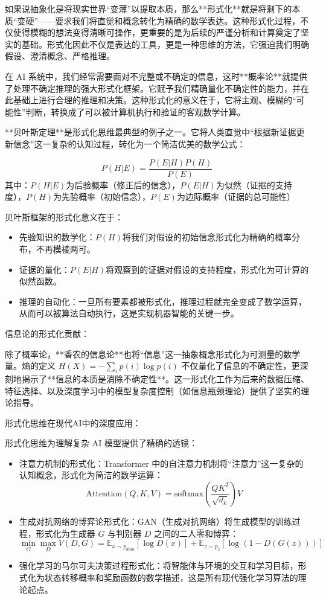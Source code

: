 如果说抽象化是将现实世界“变薄”以提取本质，那么**形式化**就是将剩下的本质“变硬”——要求我们将直觉和概念转化为精确的数学表达。这种形式化过程，不仅使得模糊的想法变得清晰可操作，更重要的是为后续的严谨分析和计算奠定了坚实的基础。形式化因此不仅是表达的工具，更是一种思维的方法，它强迫我们明确假设、澄清概念、严格推理。

在 AI 系统中，我们经常需要面对不完整或不确定的信息，这时**概率论**就提供了处理不确定推理的强大形式化框架。它赋予我们精确量化不确定性的能力，并在此基础上进行合理的推理和决策。这种形式化的意义在于，它将主观、模糊的“可能性”判断，转换成了可以被计算机执行和验证的客观数学计算。

**贝叶斯定理**是形式化思维最典型的例子之一。它将人类直觉中“根据新证据更新信念”这一复杂的认知过程，转化为一个简洁优美的数学公式：

\begin{tcolorbox}[colback=green!5!white,colframe=green!75!black,title=核心定理：贝叶斯定理]
$$P(H|E) = \frac{P(E|H)P(H)}{P(E)}$$
其中：$P(H|E)$为后验概率（修正后的信念），$P(E|H)$为似然（证据的支持度），$P(H)$为先验概率（初始信念），$P(E)$为边际概率（证据的总可能性）
\end{tcolorbox}

贝叶斯框架的形式化意义在于：

\begin{itemize}
\item 先验知识的数学化：$P(H)$将我们对假设的初始信念形式化为精确的概率分布，不再模棱两可。
\item 证据的量化：$P(E|H)$将观察到的证据对假设的支持程度，形式化为可计算的似然函数。
\item 推理的自动化：一旦所有要素都被形式化，推理过程就完全变成了数学运算，从而可以被算法自动执行，这是实现机器智能的关键一步。
\end{itemize}

信息论的形式化贡献：

除了概率论，**香农的信息论**也将“信息”这一抽象概念形式化为可测量的数学量。熵的定义 $H(X) = -\sum_{i} p(i) \log p(i)$ 不仅量化了信息的不确定性，更深刻地揭示了**信息的本质是消除不确定性**。这一形式化工作为后来的数据压缩、特征选择、以及深度学习中的模型复杂度控制（如信息瓶颈理论）提供了坚实的理论指导。

形式化思维在现代AI中的深度应用：

形式化思维为理解复杂 AI 模型提供了精确的透镜：

\begin{itemize}
\item 注意力机制的形式化：Transformer 中的自注意力机制将“注意力”这一复杂的认知概念，形式化为简洁的数学运算：$$\text{Attention}(Q,K,V) = \text{softmax}(\frac{QK^T}{\sqrt{d_k}})V$$
\item 生成对抗网络的博弈论形式化：GAN（生成对抗网络）将生成模型的训练过程，形式化为生成器 $G$ 与判别器 $D$ 之间的二人零和博弈：$$\min_G \max_D V(D,G) = \mathbb{E}_{x \sim p_{data}}[\log D(x)] + \mathbb{E}_{z \sim p_z}[\log(1-D(G(z)))]$$
\item 强化学习的马尔可夫决策过程形式化：将智能体与环境的交互和学习目标，形式化为状态转移概率和奖励函数的数学描述，这是所有现代强化学习算法的理论起点。
\end{itemize}

